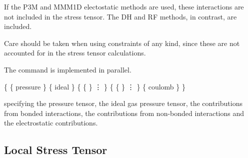 If the P3M and MMM1D electostatic methods are used, these interactions are not included in the
stress tensor.  The DH and RF methods, in contrast, are included.

Care should be taken when using constraints of any kind, since these are not accounted for
in the stress tensor calculations.

The command is implemented in parallel.


\begin{code}
\{ \{ pressure  \}
   \{ ideal  \} 
   \{ \{   \}
      \vdots
   \}
   \{ \{   \}
      \vdots
   \}
   \{ coulomb  \}
\}
\end{code}
specifying the pressure tensor, the ideal gas pressure tensor, the
contributions from bonded interactions, the contributions from
non-bonded interactions and the electrostatic contributions.

\subsection{Local Stress Tensor}
\label{analyze:local_stress_tensor}

